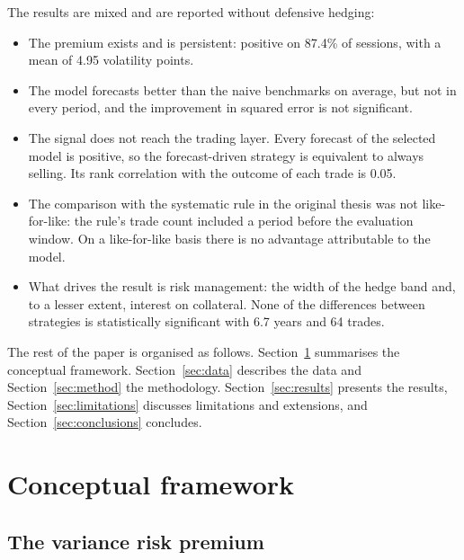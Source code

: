 \documentclass[11pt,a4paper]{article}
\begin{document}
The results are mixed and are reported without defensive hedging:
\begin{itemize}
  \item The premium exists and is persistent: positive on 87.4\% of sessions, with a mean of 4.95 volatility points.
  \item The model forecasts better than the naive benchmarks on average, but not in every period, and the improvement in squared error is not significant.
  \item The signal does not reach the trading layer. Every forecast of the selected model is positive, so the forecast-driven strategy is equivalent to always selling. Its rank correlation with the outcome of each trade is 0.05.
  \item The comparison with the systematic rule in the original thesis was not like-for-like: the rule's trade count included a period before the evaluation window. On a like-for-like basis there is no advantage attributable to the model.
  \item What drives the result is risk management: the width of the hedge band and, to a lesser extent, interest on collateral. None of the differences between strategies is statistically significant with 6.7 years and 64 trades.
\end{itemize}

The rest of the paper is organised as follows. Section~\ref{sec:framework} summarises the conceptual framework. Section~\ref{sec:data} describes the data and Section~\ref{sec:method} the methodology. Section~\ref{sec:results} presents the results, Section~\ref{sec:limitations} discusses limitations and extensions, and Section~\ref{sec:conclusions} concludes.

\section{Conceptual framework}\label{sec:framework}

\subsection{The variance risk premium}
\end{document}
